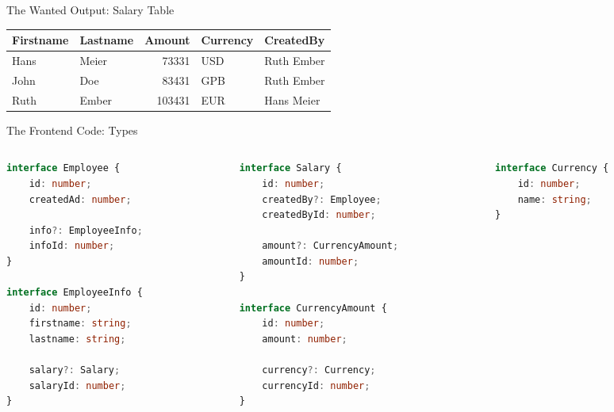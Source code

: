 \documentclass[aspectratio=169,notes]{beamer}
\begin{document}
	\begin{frame}[fragile]{The Wanted Output: Salary Table}
		\begin{center}
		\begin{tabular}{l | l | r | l | l}
			Firstname & Lastname & Amount & Currency & CreatedBy \\ \hline
			Hans & Meier & 73331 & USD & Ruth Ember \\
			John & Doe & 83431 & GPB & Ruth Ember \\
			Ruth & Ember & 103431 & EUR & Hans Meier \\
		\end{tabular}	
		\end{center}
	\end{frame}

	\begin{frame}[fragile]{The Frontend Code: Types}
\begin{columns}
\begin{column}{0.35\textwidth}
\begin{lstlisting}[language=typescript,basicstyle=\scriptsize\ttfamily]
interface Employee {
	id: number;
	createdAd: number;

	info?: EmployeeInfo;
	infoId: number;
}	

interface EmployeeInfo {
	id: number;
	firstname: string;
	lastname: string;

	salary?: Salary;
	salaryId: number;
}	
\end{lstlisting}
\end{column}
\begin{column}{0.35\textwidth}
\begin{lstlisting}[language=TypeScript,basicstyle=\scriptsize\ttfamily,firstnumber=17]
interface Salary {
	id: number;
	createdBy?: Employee;
	createdById: number;

	amount?: CurrencyAmount;
	amountId: number;
}

interface CurrencyAmount {
	id: number;
	amount: number;

	currency?: Currency;
	currencyId: number;
}
\end{lstlisting}
\end{column}
\begin{column}{0.25\textwidth}
\begin{lstlisting}[language=TypeScript,basicstyle=\scriptsize\ttfamily,firstnumber=32]
interface Currency {
	id: number;
	name: string;
}
\end{lstlisting}
\end{column}
\end{columns}
	\end{frame}
\end{document}
